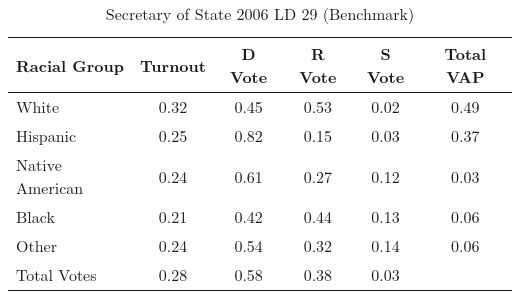 \begin{table}[htb]
\begin{center}
\caption{Secretary of State 2006 LD 29 (Benchmark)}
\label{sos06_vap_ld_29_benchmark}
\begin{tabular}{lccccc}
  \hline
Racial Group & Turnout & D Vote & R Vote & S Vote & Total VAP \\ 
  \hline
White & 0.32 & 0.45 & 0.53 & 0.02 & 0.49 \\ 
  Hispanic & 0.25 & 0.82 & 0.15 & 0.03 & 0.37 \\ 
  Native American & 0.24 & 0.61 & 0.27 & 0.12 & 0.03 \\ 
  Black & 0.21 & 0.42 & 0.44 & 0.13 & 0.06 \\ 
  Other & 0.24 & 0.54 & 0.32 & 0.14 & 0.06 \\ 
  Total Votes & 0.28 & 0.58 & 0.38 & 0.03 &  \\ 
   \hline
\end{tabular}
\end{center}
\end{table}
